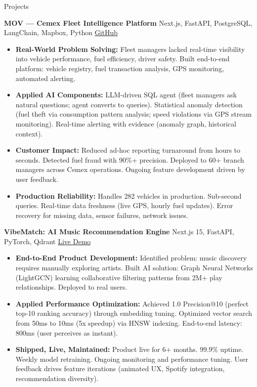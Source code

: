 \documentclass{resume}
\begin{document}
\begin{rSection}{Projects}

\textbf{MOV — Cemex Fleet Intelligence Platform} {Next.js, FastAPI, PostgreSQL, LangChain, Mapbox, Python} \hfill \href{https://github.com/Fraga9/MOV-fleet}{GitHub}
\begin{itemize}
    \item \textbf{Real-World Problem Solving:} Fleet managers lacked real-time visibility into vehicle performance, fuel efficiency, driver safety. Built end-to-end platform: vehicle registry, fuel transaction analysis, GPS monitoring, automated alerting.
    \item \textbf{Applied AI Components:} LLM-driven SQL agent (fleet managers ask natural questions; agent converts to queries). Statistical anomaly detection (fuel theft via consumption pattern analysis; speed violations via GPS stream monitoring). Real-time alerting with evidence (anomaly graph, historical context).
    \item \textbf{Customer Impact:} Reduced ad-hoc reporting turnaround from hours to seconds. Detected fuel fraud with 90\%+ precision. Deployed to 60+ branch managers across Cemex operations. Ongoing feature development driven by user feedback.
    \item \textbf{Production Reliability:} Handles 282 vehicles in production. Sub-second queries. Real-time data freshness (live GPS, hourly fuel updates). Error recovery for missing data, sensor failures, network issues.
\end{itemize}

\textbf{VibeMatch: AI Music Recommendation Engine} {Next.js 15, FastAPI, PyTorch, Qdrant} \hfill \href{https://www.vibematchs.me/}{Live Demo}
\begin{itemize}
    \item \textbf{End-to-End Product Development:} Identified problem: music discovery requires manually exploring artists. Built AI solution: Graph Neural Networks (LightGCN) learning collaborative filtering patterns from 2M+ play relationships. Deployed to real users.
    \item \textbf{Applied Performance Optimization:} Achieved 1.0 Precision@10 (perfect top-10 ranking accuracy) through embedding tuning. Optimized vector search from 50ms to 10ms (5x speedup) via HNSW indexing. End-to-end latency: 800ms (user perceives as instant).
    \item \textbf{Shipped, Live, Maintained:} Product live for 6+ months. 99.9\% uptime. Weekly model retraining. Ongoing monitoring and performance tuning. User feedback drives feature iterations (animated UX, Spotify integration, recommendation diversity).
\end{itemize}


\end{rSection}
\end{document}
